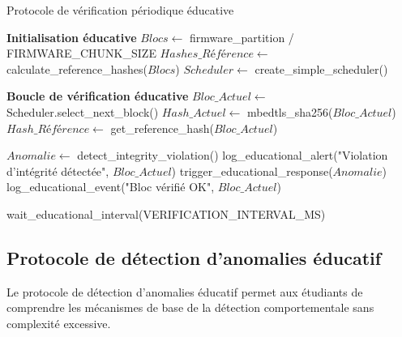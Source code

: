 \begin{algorithm}
\caption{Protocole de vérification périodique éducative}
\label{alg:periodic-verification-educational}
\begin{algorithmic}[1]
\State \textbf{Initialisation éducative}
\State $Blocs \leftarrow$ firmware\_partition / FIRMWARE\_CHUNK\_SIZE
\State $Hashes\_Référence \leftarrow$ calculate\_reference\_hashes($Blocs$)
\State $Scheduler \leftarrow$ create\_simple\_scheduler()

\State \textbf{Boucle de vérification éducative}
    \State $Bloc\_Actuel \leftarrow$ Scheduler.select\_next\_block()
    \State $Hash\_Actuel \leftarrow$ mbedtls\_sha256($Bloc\_Actuel$)
    \State $Hash\_Référence \leftarrow$ get\_reference\_hash($Bloc\_Actuel$)
    
        \State $Anomalie \leftarrow$ detect\_integrity\_violation()
        \State log\_educational\_alert("Violation d'intégrité détectée", $Bloc\_Actuel$)
        \State trigger\_educational\_response($Anomalie$)
    \Else
        \State log\_educational\_event("Bloc vérifié OK", $Bloc\_Actuel$)
    \EndIf
    
    \State wait\_educational\_interval(VERIFICATION\_INTERVAL\_MS)
\EndWhile
\end{algorithmic}
\end{algorithm}

\subsection{Protocole de détection d'anomalies éducatif}

Le protocole de détection d'anomalies éducatif permet aux étudiants de comprendre les mécanismes de base de la détection comportementale sans complexité excessive.

